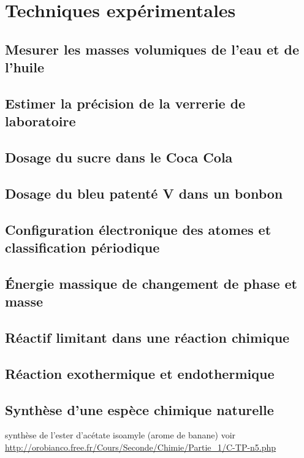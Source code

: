 \chapter{Techniques expérimentales}

\section{Mesurer les masses volumiques de l'eau et de l'huile}
\label{TP:mesure-masse-volumique-eau-huile}


\section{Estimer la précision de la verrerie de laboratoire}

\section{Dosage du sucre dans le Coca Cola }

\section{Dosage du bleu patenté V dans un bonbon }

\section{Configuration électronique des atomes et classification périodique}

\section{Énergie massique de changement de phase et masse }

\section{Réactif limitant dans une réaction chimique }

\section{Réaction exothermique et endothermique}

\section{Synthèse d'une espèce chimique naturelle }
synthèse de l'ester d'acétate isoamyle (arome de banane)
voir \url{http://orobianco.free.fr/Cours/Seconde/Chimie/Partie_1/C-TP-n5.php}

